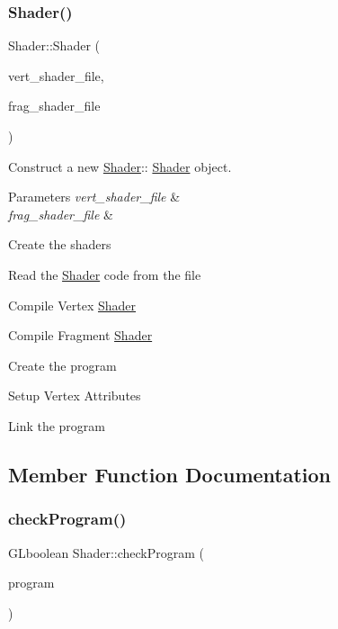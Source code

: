 \subsubsection{\texorpdfstring{Shader()}{Shader()}}
{\footnotesize\ttfamily Shader\+::\+Shader (\begin{DoxyParamCaption}\item[{string}]{vert\+\_\+shader\+\_\+file,  }\item[{string}]{frag\+\_\+shader\+\_\+file }\end{DoxyParamCaption})}



Construct a new \mbox{\hyperlink{classShader}{Shader}}\+:\+: \mbox{\hyperlink{classShader}{Shader}} object. 


\begin{DoxyParams}{Parameters}
{\em vert\+\_\+shader\+\_\+file} & \\
\hline
{\em frag\+\_\+shader\+\_\+file} & \\
\hline
\end{DoxyParams}
Create the shaders

Read the \mbox{\hyperlink{classShader}{Shader}} code from the file

Compile Vertex \mbox{\hyperlink{classShader}{Shader}}

Compile Fragment \mbox{\hyperlink{classShader}{Shader}}

Create the program

Setup Vertex Attributes

Link the program 

\subsection{Member Function Documentation}
\mbox{\label{classShader_a279452402be44a4e97f0be5838fe7e79}} 
\subsubsection{\texorpdfstring{checkProgram()}{checkProgram()}}
{\footnotesize\ttfamily G\+Lboolean Shader\+::check\+Program (\begin{DoxyParamCaption}\item[{G\+Luint}]{program }\end{DoxyParamCaption})\hspace{0.3cm}{\ttfamily [protected]}}



